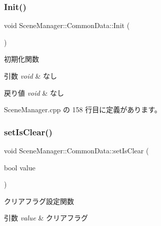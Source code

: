 \mbox{\label{class_scene_manager_1_1_common_data_aaea4c2121bc62ed78e62d867ac951a10}} 
\subsubsection{\texorpdfstring{Init()}{Init()}}
{\footnotesize\ttfamily void Scene\+Manager\+::\+Common\+Data\+::\+Init (\begin{DoxyParamCaption}{ }\end{DoxyParamCaption})}



初期化関数 


\begin{DoxyParams}{引数}
{\em void} & なし \\
\hline
\end{DoxyParams}

\begin{DoxyRetVals}{戻り値}
{\em void} & なし \\
\hline
\end{DoxyRetVals}


 Scene\+Manager.\+cpp の 158 行目に定義があります。

\mbox{\label{class_scene_manager_1_1_common_data_a63ed55beac6b37243cafdbec26870fc3}} 
\subsubsection{\texorpdfstring{set\+Is\+Clear()}{setIsClear()}}
{\footnotesize\ttfamily void Scene\+Manager\+::\+Common\+Data\+::set\+Is\+Clear (\begin{DoxyParamCaption}\item[{bool}]{value }\end{DoxyParamCaption})}



クリアフラグ設定関数 


\begin{DoxyParams}{引数}
{\em value} & クリアフラグ \\
\hline
\end{DoxyParams}

